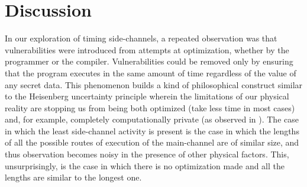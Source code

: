 \section{Discussion}

In our exploration of timing side-channels, a repeated observation was that vulnerabilities were introduced from attempts at optimization, whether by the programmer or the compiler. Vulnerabilities could be removed only by ensuring that the program executes in the same amount of time regardless of the value of any secret data. 
This phenomenon builds a kind of philosophical construct similar to the Heisenberg
uncertainty principle wherein the limitations of our physical reality are stopping
us from being both optimized (take less time in most cases) and, for example, 
completely computationally private (as observed in \cite{oberg2014leveraging}). The
case in which the least side-channel activity is present is the case in which the 
lengths of all the possible routes of execution of the main-channel are of similar
size, and thus observation becomes noisy in the presence of other physical factors.
This, unsurprisingly, is the case in which there is no optimization made and all the
lengths are similar to the longest one.



